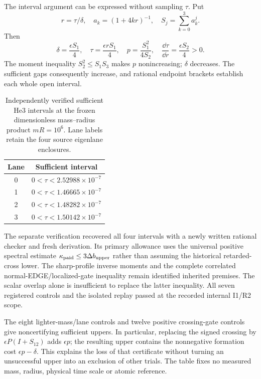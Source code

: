 The interval argument can be expressed without sampling $\tau$. Put
\begin{equation}
r=\tau/\delta,\quad a_k=(1+4kr)^{-1},\quad
S_j=\sum_{k=0}^{3}a_k^j.
\end{equation}
Then
\begin{equation}
\delta=\frac{\epsilon S_1}{4},\quad
\tau=\frac{\epsilon rS_1}{4},\quad
p=\frac{S_1^2}{4S_2},\quad
\frac{\dd\tau}{\dd r}=\frac{\epsilon S_2}{4}>0.
\end{equation}
The moment inequality $S_2^2\leq S_1S_3$ makes $p$ nonincreasing; $\delta$
decreases. The sufficient gaps consequently increase, and rational endpoint
brackets establish each whole open interval.

\begin{table}[htbp]
\centering\small
\caption{Independently verified sufficient He3 intervals at the frozen
dimensionless mass--radius product $mR=10^6$. Lane labels retain the four
source eigenlane enclosures.}
\begin{tabular}{cc}\toprule
Lane & Sufficient interval\\\midrule
0 & $0<\tau<2.52988\times10^{-7}$\\
1 & $0<\tau<1.46665\times10^{-7}$\\
2 & $0<\tau<1.48282\times10^{-7}$\\
3 & $0<\tau<1.50142\times10^{-7}$\\\bottomrule
\end{tabular}
\label{tab:he3-paid-new}
\end{table}

The separate verification recovered all four intervals with a newly written
rational checker and fresh derivation. Its primary allowance uses the
universal positive spectral estimate $\kappa_{\rm paid}\leq
3\Delta b_{\rm upper}$ rather than assuming the historical retarded-cross
lower. The sharp-profile inverse moments and the complete correlated
normal-EDGE/localized-gate inequality remain identified inherited premises.
The scalar overlap alone is insufficient to replace the latter inequality.
All seven registered controls and the isolated replay passed at the recorded
internal I1/R2 scope.

The eight lighter-mass/lane controls and twelve positive crossing-gate
controls give noncertifying sufficient uppers. In particular, replacing the
signed crossing by $\epsilon P(I+S_{12})$ adds $\epsilon p$; the resulting
upper contains the nonnegative formation cost $\epsilon p-\delta$.
This explains the loss of that certificate without turning an unsuccessful
upper into an exclusion of other trials. The table fixes no measured mass,
radius, physical time scale or atomic reference.

